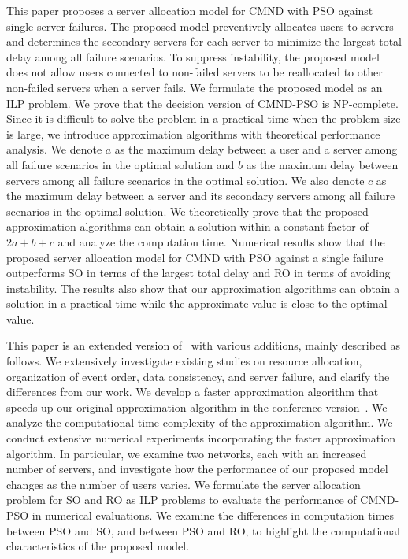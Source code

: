\documentclass[10pt, letterpaper]{IEEEtran}
\begin{document}
\begin{CJK}{UTF8}{ipxm}
This paper proposes a server allocation model for CMND with PSO against single-server failures.
The proposed model preventively allocates users to servers and determines the secondary servers for each server to minimize the largest total delay among all failure scenarios.
To suppress instability, the proposed model does not allow users connected to non-failed servers to be reallocated to other non-failed servers when a server fails.
We formulate the proposed model as an ILP problem.
We prove that the decision version of CMND-PSO is NP-complete.
Since it is difficult to solve the problem in a practical time when the problem size is large, we introduce approximation algorithms with theoretical performance analysis.
We denote $a$ as the maximum delay between a user and a server among all failure scenarios in the optimal solution and $b$ as the maximum delay between servers among all failure scenarios in the optimal solution.
We also denote $c$ as the maximum delay between a server and its secondary servers among all failure scenarios in the optimal solution.
We theoretically prove that the proposed approximation algorithms can obtain a solution within a constant factor of $2a+b+c$ and analyze the computation time.
Numerical results show that the proposed server allocation model for CMND with PSO against a single failure outperforms SO in terms of the largest total delay and RO in terms of avoiding instability.
The results also show that our approximation algorithms can obtain a solution in a practical time while the approximate value is close to the optimal value.

This paper is an extended version of~\cite{Oda_ICCCN2025} with various additions, mainly described as follows.
We extensively investigate existing studies on resource allocation, organization of event order, data consistency, and server failure, and clarify the differences from our work.
We develop a faster approximation algorithm that speeds up our original approximation algorithm in the conference version~\cite{Oda_ICCCN2025}.
We analyze the computational time complexity of the approximation algorithm.
We conduct extensive numerical experiments incorporating the faster approximation algorithm. In particular, we examine two networks, each with an increased number of servers, and investigate how the performance of our proposed model changes as the number of users varies.
We formulate the server allocation problem for SO and RO as ILP problems to evaluate the performance of CMND-PSO in numerical evaluations. We examine the differences in computation times between PSO and SO, and between PSO and RO, to highlight the computational characteristics of the proposed model.


\end{CJK}
\end{document}
